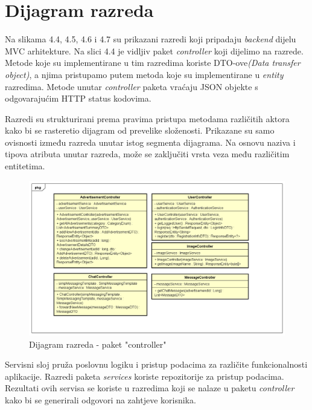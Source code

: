 			\eject
			
			
		\section{Dijagram razreda}

                \noindent Na slikama 4.4, 4.5, 4.6 i 4.7 su prikazani razredi koji pripadaju \textit{backend} dijelu MVC arhitekture. Na slici 4.4 je vidljiv paket \textit{controller} koji dijelimo na razrede. Metode koje su implementirane u tim razredima koriste DTO-ove\textit{(Data transfer object)}, a njima pristupamo putem metoda koje su implementirane u \textit{entity} razredima. Metode unutar \textit{controller} paketa vraćaju JSON objekte s odgovarajućim HTTP status kodovima.
			
			Razredi su strukturirani prema pravima pristupa metodama            različitih aktora kako bi se rasteretio dijagram od prevelike       složenosti. Prikazane su samo ovisnosti između razreda unutar       istog segmenta dijagrama. Na osnovu naziva i tipova atributa        unutar razreda, može se zaključiti vrsta veza među različitim       entitetima.

			\begin{figure}[htb]
				\centering
				\includegraphics[width=\textwidth]{slike/dr1_kontroleri.png}
				\caption{Dijagram razreda - paket "controller"}
			\end{figure}
			\pagebreak

                Servisni sloj pruža poslovnu logiku i pristup podacima za različite funkcionalnosti aplikacije. Razredi paketa \textit{services} koriste repozitorije za pristup podacima. Rezultati ovih servisa se koriste u razredima koji se nalaze u paketu \textit{controller} kako bi se generirali odgovori na zahtjeve korisnika.
   
